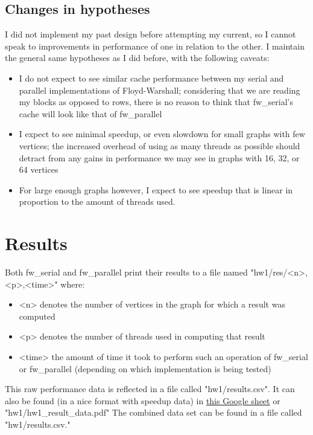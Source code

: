 \documentclass[]{article}
\begin{document}
	\subsection{Changes in hypotheses}
	I did not implement my past design before attempting my current, so I cannot speak to improvements in performance of one in relation to the other. I maintain the general same hypotheses as I did before, with the following caveats:
	\begin{itemize}
		\item I do not expect to see similar cache performance between my serial and parallel implementations of Floyd-Warshall; considering that we are reading my blocks as opposed to rows, there is no reason to think that fw\_serial's cache will look like that of fw\_parallel
		\item I expect to see minimal speedup, or even slowdown for small graphs with few vertices; the increased overhead of using as many threads as possible should detract from any gains in performance we may see in graphs with 16, 32, or 64 vertices
		\item For large enough graphs however, I expect to see speedup that is linear in proportion to the amount of threads used.
	\end{itemize}
\section{Results}
	Both fw\_serial and fw\_parallel print their results to a file named "hw1/res/<n>,<p>,<time>" where:
	\begin{itemize}
		\item <n> denotes the number of vertices in the graph for which a result was computed
		\item <p> denotes the number of threads used in computing that result
		\item <time> the amount of time it took to perform such an operation of fw\_serial or fw\_parallel (depending on which implementation is being tested)
	\end{itemize}
	This raw performance data is reflected in a file called "hw1/results.csv". It can also be found (in a nice format with speedup data) in \href{https://docs.google.com/spreadsheets/d/1XrjW1c_qoefwkYxm_nAwCrnQ4Z4TFlYyeFtUYgdvXZE/edit?usp=sharing}{this Google sheet} or "hw1/hw1\_result\_data.pdf"
 	The combined data set can be found in a file called "hw1/results.csv."
\end{document}
